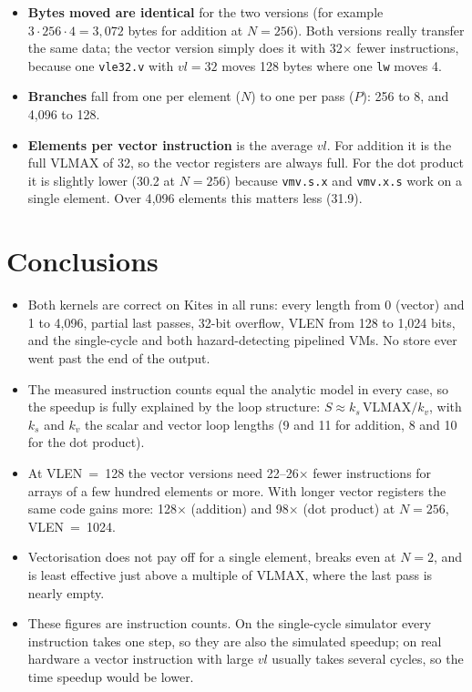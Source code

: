 \documentclass[11pt,a4paper]{article}
\newcommand{\code}[1]{\texttt{#1}}
\begin{document}
\begin{itemize}
  \item \textbf{Bytes moved are identical} for the two versions (for example $3 \cdot 256 \cdot
        4 = 3{,}072$ bytes for addition at $N=256$). Both versions really transfer the same
        data; the vector version simply does it with 32$\times$ fewer instructions, because one
        \code{vle32.v} with $vl=32$ moves 128 bytes where one \code{lw} moves 4.
  \item \textbf{Branches} fall from one per element ($N$) to one per pass ($P$): 256 to 8, and
        4{,}096 to 128.
  \item \textbf{Elements per vector instruction} is the average $vl$. For addition it is the
        full VLMAX of 32, so the vector registers are always full. For the dot product it is
        slightly lower (30.2 at $N=256$) because \code{vmv.s.x} and \code{vmv.x.s} work on a
        single element. Over 4{,}096 elements this matters less (31.9).
\end{itemize}

\section{Conclusions}

\begin{itemize}
  \item Both kernels are correct on Kites in all \runsTotal{} runs: every length from 0 (vector)
        and 1 to 4{,}096, partial last passes, 32-bit overflow, VLEN from 128 to 1{,}024 bits, and
        the single-cycle and both hazard-detecting pipelined VMs. No store ever went past the end
        of the output.
  \item The measured instruction counts equal the analytic model in every case, so the speedup
        is fully explained by the loop structure: $S \approx k_s\,\mathrm{VLMAX}/k_v$, with
        $k_s$ and $k_v$ the scalar and vector loop lengths (9 and 11 for addition, 8 and 10 for
        the dot product).
  \item At VLEN~=~128 the vector versions need 22--26$\times$ fewer instructions for arrays of a
        few hundred elements or more. With longer vector registers the same code gains more:
        128$\times$ (addition) and 98$\times$ (dot product) at $N=256$, VLEN~=~1024.
  \item Vectorisation does not pay off for a single element, breaks even at $N=2$, and is
        least effective just above a multiple of VLMAX, where the last pass is nearly empty.
  \item These figures are instruction counts. On the single-cycle simulator every instruction
        takes one step, so they are also the simulated speedup; on real hardware a vector
        instruction with large $vl$ usually takes several cycles, so the time speedup would be
        lower.
\end{itemize}
\end{document}
